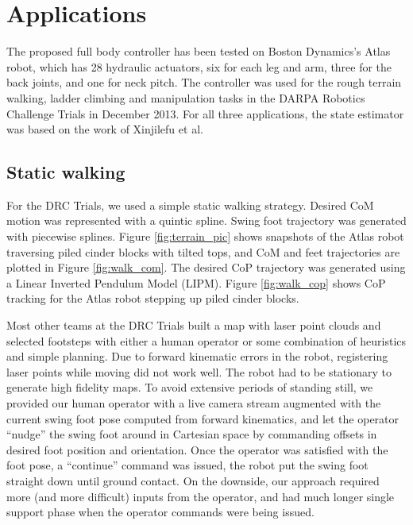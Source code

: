 \documentclass{ws-ijhr}
\newcommand{\fref}[1] {Figure \ref{#1}}
\begin{document}
\section{Applications}
\label{sec:trials_tasks}
The proposed full body controller has been tested on Boston Dynamics's Atlas robot,
which has 28 hydraulic actuators, six for each leg and arm, three for the back 
joints, and one for neck pitch. 
The controller was used for the rough terrain walking, ladder climbing
and manipulation tasks in the DARPA Robotics Challenge Trials in December 2013. 
For all three applications, the state estimator was based on the work of 
Xinjilefu et al. \cite{xinji}

\subsection{Static walking}
\label{sec:static_walking}
For the DRC Trials, we used a simple static walking strategy. 
Desired CoM motion was represented with a quintic spline. 
Swing foot trajectory was generated with piecewise splines. 
\fref{fig:terrain_pic} shows snapshots of the Atlas robot traversing piled cinder
blocks with tilted tops, and CoM and feet trajectories are plotted in 
\fref{fig:walk_com}. 
The desired CoP trajectory was generated using a Linear Inverted Pendulum 
Model (LIPM). 
\fref{fig:walk_cop} shows CoP tracking for the Atlas robot stepping up piled cinder blocks. 

Most other teams at the DRC Trials built a map with laser point clouds and 
selected footsteps with either a human operator or some combination of 
heuristics and simple planning. 
Due to forward kinematic errors in the robot, registering laser points while
moving did not work well. 
The robot had to be stationary to generate high fidelity maps. 
To avoid extensive periods of standing still, we provided our human operator 
with a live camera stream augmented with the current swing foot pose computed
from forward kinematics, and let the operator ``nudge'' the swing foot around
in Cartesian space by commanding offsets in desired foot position and orientation. 
Once the operator was satisfied with the foot pose, a ``continue'' command was 
issued, the robot put the swing foot straight down until ground contact. 
On the downside, our approach required more (and more difficult) inputs from 
the operator, and had much longer single support phase when the operator 
commands were being issued.
\end{document}
